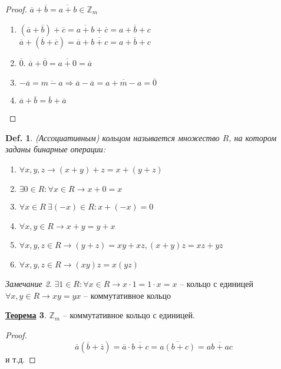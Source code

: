 \documentclass[12pt]{article}
\newenvironment{MyList}[1][4pt]{
  \begin{enumerate}[1.]
  \setlength{\parskip}{0pt}
  \setlength{\itemsep}{#1}
}{       
  \end{enumerate}
}
\def\Z{\mathbb{Z}}       %
\def\SO{\Rightarrow}     %
\theoremstyle{definition} %
\newtheorem{Thm}{\underline{Теорема}}[subsection] %
\theoremstyle{plain} %
\newtheorem{Def}[Thm]{Def.} %
\theoremstyle{remark} %
\newtheorem{Rem}[Thm]{Замечание} %
\begin{document}
\begin{proof}
    $\overline{a} + \overline{b} = \overline{a + b} \in \Z_m$
    \begin{MyList}
        \item $(\overline{a} + \overline{b}) + \overline{c} = \overline{a + b} + \overline{c} = \overline{a + b + c}$ \\
        $\overline{a} + (\overline{b} + \overline{c}) = \overline{a} + \overline{b + c} = \overline{a + b + c}$
        \item $\overline{0}$. $\overline{a} + \overline{0} = \overline{a + 0} = \overline{a}$
        \item $-\overline{a} = \overline{m - a} \SO \overline{a} - \overline{a} = \overline{a + m - a} = \overline{0}$
        \item $\overline{a} + \overline{b} = \overline{b} + \overline{a}$      
    \end{MyList} 
\end{proof}

\begin{Def}
    (Ассоциативным) кольцом называется множество $R$, на котором заданы бинарные операции:
    \begin{MyList}
        \item $\forall x, y, z \to (x + y) + z = x + (y + z)$ 
        \item $\exists 0 \in R : \forall x \in R \to x + 0 = x$ 
        \item $\forall x \in R \ \exists (-x) \in R : x + (-x) = 0$ 
        \item $\forall x, y \in R \to x + y = y + x$ 
        \item $\forall x, y, z \in R \to (y + z) = xy + xz, (x + y)z = xz + yz$ 
        \item $\forall x, y, z \in R \to (xy)z = x(yz)$ 
    \end{MyList}
\end{Def}

\begin{Rem}
    $\exists 1 \in R : \forall x \in R \to x \cdot 1 = 1 \cdot x = x$ -- кольцо с единицей \\
    $\forall x, y \in R \to xy = yx$ -- коммутативное кольцо 
\end{Rem}

\begin{Thm}
    $\Z_m$ -- коммутативное кольцо с единицей.
\end{Thm}

\begin{proof}
    \[\overline{a}(\overline{b} + \overline{z}) = \overline{a} \cdot \overline{b + c} = \overline{a(b + c)} = \overline{ab + ac}\]
    и т.д.
\end{proof}
\end{document}
